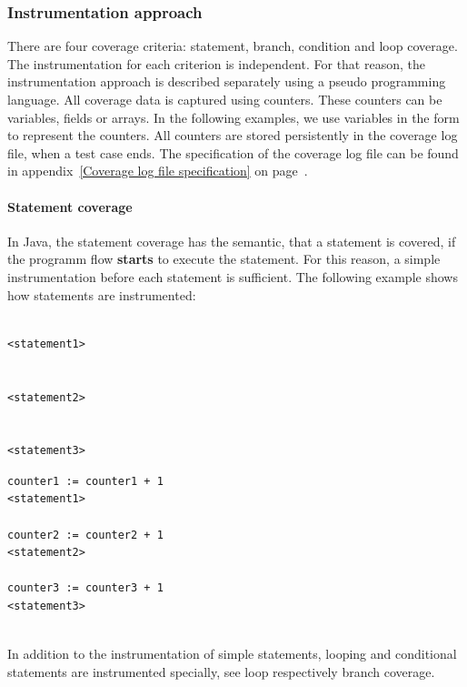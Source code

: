 \subsubsection{Instrumentation approach}
There are four coverage criteria: statement, branch, condition and loop coverage. The instrumentation for each criterion is independent. For that reason, the instrumentation approach is described separately using a pseudo programming language. All coverage data is captured using counters. These counters can be variables, fields or arrays. In the following examples, we use variables in the form  to represent the counters. All counters are stored persistently in the coverage log file, when a test case ends. The specification of the coverage log file can be found in appendix~\ref{Coverage log file specification} on page~\pageref{Coverage log file specification}.

\paragraph{Statement coverage}
In Java, the statement coverage has the semantic, that a statement is covered, if the programm flow \textbf{starts} to execute the statement. For this reason, a simple instrumentation before each statement is sufficient. The following example shows how statements are instrumented:
\newline\\
\begin{minipage}[t]{0.5\textwidth}
\begin{verbatim}

<statement1>


<statement2>


<statement3>
\end{verbatim}
\end{minipage}
\begin{minipage}[t]{0.5\textwidth}
\begin{verbatim}
counter1 := counter1 + 1
<statement1>

counter2 := counter2 + 1
<statement2>

counter3 := counter3 + 1
<statement3>
\end{verbatim}
\end{minipage}
\newline\\
In addition to the instrumentation of simple statements, looping and conditional statements are instrumented specially, see loop respectively branch coverage.

